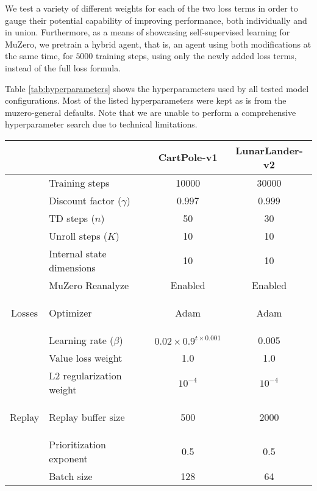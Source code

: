 We test a variety of different weights for each of the two loss terms in order to gauge their potential capability of improving performance, both individually and in union. Furthermore, as a means of showcasing self-supervised learning for MuZero, we pretrain a hybrid agent, that is, an agent using both modifications at the same time, for $5000$ training steps, using only the newly added loss terms, instead of the full loss formula.

Table \ref{tab:hyperparameters} shows the hyperparameters used by all tested model configurations. Most of the listed hyperparameters were kept as is from the muzero-general defaults. Note that we are unable to perform a comprehensive hyperparameter search due to technical limitations.
\begin{table}[ht]
    \centering
    \begin{tabular}{|c|l||c|c|}
        \hline
        & & CartPole-v1 & LunarLander-v2 \\
        \hline\hline

        & Training steps & 10000 & 30000 \\
        \cline{2-4}
        & Discount factor ($\gamma$) & 0.997 & 0.999 \\
        \cline{2-4}
        & TD steps ($n$) & 50 & 30 \\
        \cline{2-4}
        & Unroll steps ($K$) & 10 & 10 \\
        \cline{2-4}
        & Internal state dimensions & 10 & 10 \\
        \cline{2-4}
        & MuZero Reanalyze & Enabled & Enabled \\

        \hline

        \multirow{4.1}{*}{\begin{sideways}Losses\end{sideways}} & Optimizer & Adam & Adam \\
        \cline{2-4}
        & Learning rate ($\beta$) & $0.02 \times 0.9^{t \times 0.001}$ & 0.005 \\
        \cline{2-4}
        & Value loss weight & 1.0 & 1.0 \\
        \cline{2-4}
        & L2 regularization weight & $10^{-4}$ & $10^{-4}$ \\

        \hline

        \multirow{3.2}{*}{\begin{sideways}Replay\end{sideways}} & Replay buffer size & 500 & 2000 \\
        \cline{2-4}
        & Prioritization exponent & 0.5 & 0.5 \\
        \cline{2-4}
        & Batch size & 128 & 64 \\


\end{tabular}
\end{table}
